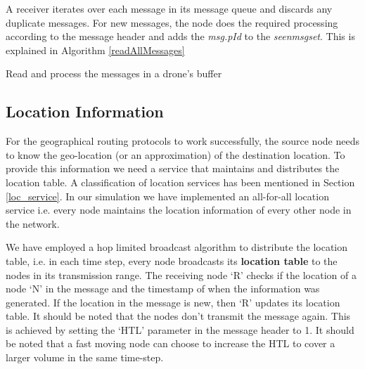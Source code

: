 A receiver iterates over each message in its message queue and discards any duplicate messages. For new messages, the node does the required processing according to the message header and adds the \emph{msg.pId} to the \emph{seen\textunderscore msg\textunderscore set}. This is explained in Algorithm \ref{readAllMessages}

\begin{algorithm}
    \caption{Read and process the messages in a drone's buffer} 
    \label{readAllMessages}
    \DontPrintSemicolon
    
\end{algorithm}

\subsection{Location Information} \label{loc_service_impl}

For the geographical routing protocols to work successfully, the source node needs to know the geo-location (or an approximation) of the destination location. To provide this information we need a service that maintains and distributes the location table. A classification of location services has been mentioned in Section \ref{loc_service}. In our simulation we have implemented an all-for-all location service i.e. every node maintains the location information of every other node in the network. 

We have employed a hop limited broadcast algorithm to distribute the location table, i.e. in each time step, every node broadcasts its \textbf{location table} to the nodes in its transmission range. The receiving node `R' checks if the location of a node `N' in the message and the timestamp of when the information was generated. If the location in the message is new, then `R' updates its location table. It should be noted that the nodes don't transmit the message again. This is achieved by setting the `HTL' parameter in the message header to 1. It should be noted that a fast moving node can choose to increase the HTL to cover a larger volume in the same time-step.


